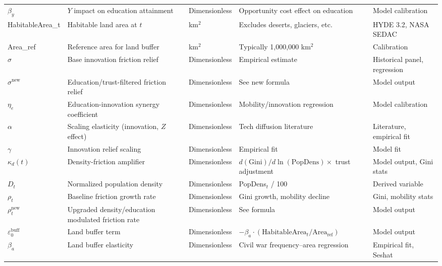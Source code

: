 \documentclass[12pt]{article}
\begin{document}
\begin{longtable}{|p{2.8cm}|p{4.3cm}|p{2.0cm}|p{3.0cm}|p{3.0cm}|}
$\beta_y$ & $Y$ impact on education attainment & Dimensionless & Opportunity cost effect on education & Model calibration \\
HabitableArea\_t & Habitable land area at $t$ & km$^2$ & Excludes deserts, glaciers, etc. & HYDE 3.2, NASA SEDAC \\
Area\_ref & Reference area for land buffer & km$^2$ & Typically 1,000,000 km$^2$ & Calibration \\
$\sigma$ & Base innovation friction relief & Dimensionless & Empirical estimate & Historical panel, regression \\
$\sigma^{\text{new}}$ & Education/trust-filtered friction relief & Dimensionless & See new formula & Model output \\
$\eta_e$ & Education-innovation synergy coefficient & Dimensionless & Mobility/innovation regression & Model calibration \\
$\alpha$ & Scaling elasticity (innovation, $Z$ effect) & Dimensionless & Tech diffusion literature & Literature, empirical fit \\
$\gamma$ & Innovation relief scaling & Dimensionless & Empirical fit & Model fit \\
$\kappa_d(t)$ & Density-friction amplifier & Dimensionless & $d(\text{Gini})/d\ln(\text{PopDens}) \times$ trust adjustment & Model output, Gini stats \\
$D_t$ & Normalized population density & Dimensionless & PopDens$_t$ / 100 & Derived variable \\
$\rho_t$ & Baseline friction growth rate & Dimensionless & Gini growth, mobility decline & Gini, mobility stats \\
$\rho_t^{\text{new}}$ & Upgraded density/education modulated friction rate & Dimensionless & See formula & Model output \\
$\varepsilon_0^{\text{buff}}$ & Land buffer term & Dimensionless & $-\beta_a \cdot (\text{HabitableArea}_t / \text{Area}_\text{ref})$ & Model output \\
$\beta_a$ & Land buffer elasticity & Dimensionless & Civil war frequency–area regression & Empirical fit, Seshat \\

\end{longtable}
\end{document}
